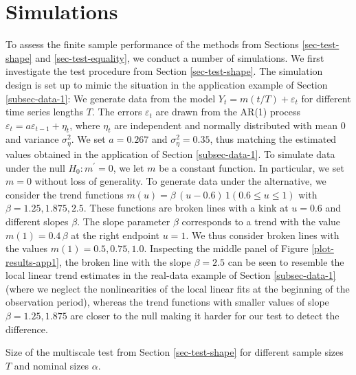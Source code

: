 
\section{Simulations}\label{sec-sim}


To assess the finite sample performance of the methods from Sections \ref{sec-test-shape} and \ref{sec-test-equality}, we conduct a number of simulations. We first investigate the test procedure from Section \ref{sec-test-shape}. The simulation design is set up to mimic the situation in the application example of Section \ref{subsec-data-1}: We generate data from the model $Y_t = m(t/T) + \varepsilon_t$ for different time series lengths $T$. The errors $\varepsilon_t$ are drawn from the AR(1) process $\varepsilon_t = a \varepsilon_{t-1} + \eta_t$, where $\eta_t$ are independent and normally distributed with mean $0$ and variance $\sigma_\eta^2$. We set $a = 0.267$ and $\sigma_\eta^2 = 0.35$, thus matching the estimated values obtained in the application of Section \ref{subsec-data-1}. To simulate data under the null $H_0: m^\prime = 0$, we let $m$ be a constant function. In particular, we set $m = 0$ without loss of generality. To generate data under the alternative, we consider the trend functions $m(u) = \beta \, (u - 0.6) \, 1(0.6 \le u \le 1)$ with $\beta = 1.25, 1.875, 2.5$. These functions are broken lines with a kink at $u = 0.6$ and different slopes $\beta$. The slope parameter $\beta$ corresponds to a trend with the value $m(1) = 0.4 \, \beta$ at the right endpoint $u = 1$. We thus consider broken lines with the values $m(1) = 0.5, 0.75, 1.0$. Inspecting the middle panel of Figure \ref{plot-results-app1}, the broken line with the slope $\beta = 2.5$ can be seen to resemble the local linear trend estimates in the real-data example of Section \ref{subsec-data-1} (where we neglect the nonlinearities of the local linear fits at the beginning of the observation period), whereas the trend functions with smaller values of slope $\beta = 1.25, 1.875$ are closer to the null making it harder for our test to detect the difference.

\begin{table}[t]
\footnotesize{
\begin{center}
\caption{Size of the multiscale test from Section \ref{sec-test-shape} for different sample sizes $T$ and nominal sizes $\alpha$.}
\label{tab:size_shape}
\renewcommand{\arraystretch}{1.2}

\end{center}}
\end{table}


